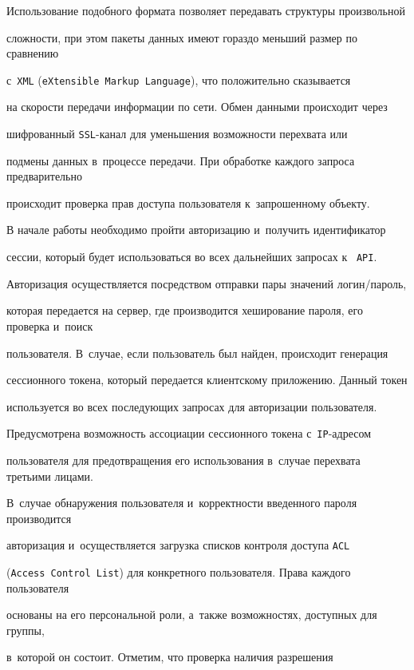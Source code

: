  Использование подобного формата позволяет передавать структуры произвольной 


 сложности, при этом пакеты данных имеют гораздо меньший размер по сравнению 


 с~\verb"XML" (\verb"eXtensible Markup Language"), что положительно сказывается 


 на скорости передачи информации по сети. Обмен данными происходит через 


 шифрованный \verb"SSL"-ка\-нал для уменьшения возможности перехвата или 


 подмены данных в~процессе передачи. При обработке каждого запроса предварительно 


 происходит проверка прав доступа пользователя к~запрошенному объекту.





В начале работы  необходимо пройти авторизацию и~получить идентификатор 


сессии, который будет использоваться во всех дальнейших запросах к~ \verb"API". 


Авторизация осуществляется посредством отправки пары значений ло\-гин/па\-роль, 


которая передается на сервер, где производится хеширование пароля, его проверка и~поиск 


пользователя. В~случае, если пользователь был найден, происходит генерация 


сессионного токена, который передается клиентскому приложению. Данный токен 


используется во всех последующих запросах для авторизации пользователя. 


Предусмотрена возможность ассоциации сессионного токена с~\verb"IP"-ад\-ре\-сом 


пользователя для предотвращения его использования в~случае перехвата третьими лицами. 


В~случае обнаружения пользователя и~корректности введенного пароля производится 


авторизация и~осуществляется загрузка списков контроля доступа \verb"ACL" 


(\verb"Access Control List") для конкретного пользователя. Права каж\-до\-го пользователя 


основаны на его персональной роли, а~также возможностях, доступных для группы, 


в~которой он состоит. Отметим, что проверка наличия разрешения 


